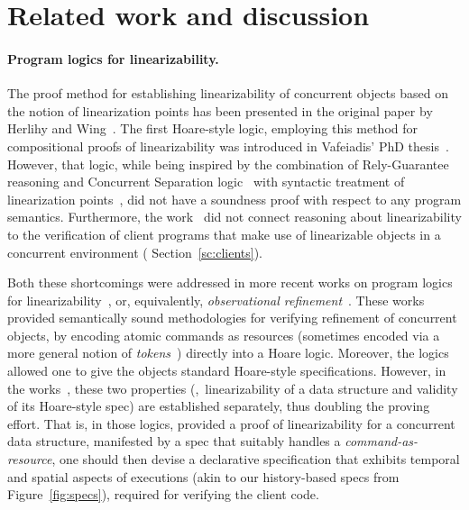 \section{Related work and discussion}
\label{sc:related}


\paragraph{Program logics for linearizability.}

The proof method for establishing linearizability of concurrent
objects based on the notion of linearization points has been
presented in the original paper by Herlihy and
Wing~\cite{HerlihyW+TOPLAS90}. The first Hoare-style logic, employing
this method for compositional proofs of linearizability was introduced
in Vafeiadis' PhD thesis~\cite{Vafeiadis+PhD07}. However, that logic,
while being inspired by the combination of Rely-Guarantee reasoning
and Concurrent Separation logic~\cite{VafeiadisP+CONCUR07} with
syntactic treatment of linearization
points~\cite{VafeiadisHHS+PPoPP06}, did not have a soundness proof
with respect to any program semantics. Furthermore, the
work~\cite{Vafeiadis+PhD07} did not connect reasoning about
linearizability to the verification of client programs that make use
of linearizable objects in a concurrent environment (\cf
Section~\ref{sc:clients}).



Both these shortcomings were addressed in more recent works on program
logics for linearizability~\cite{LiangF+PLDI13,Khyzha-al:FM16}, or,
equivalently, \emph{observational
  refinement}~\cite{FilipovicOHRW+TCS10,TuronDB+ICFP13}. These works
provided semantically sound methodologies for verifying refinement of
concurrent objects, by encoding atomic commands as resources
(sometimes encoded via a more general notion of
\emph{tokens}~\cite{Khyzha-al:FM16}) directly into a Hoare
logic. Moreover, the logics~\cite{LiangF+PLDI13, TuronDB+ICFP13}
allowed one to give the objects standard Hoare-style specifications.
%
However, in the works~\cite{LiangF+PLDI13,TuronDB+ICFP13}, these two
properties (\ie,~linearizability of a data structure and validity of
its Hoare-style spec) are established separately, thus doubling the
proving effort.
%
That is, in those logics, provided a proof of linearizability for a
concurrent data structure, manifested by a spec that suitably handles
a \emph{command-as-resource}, one should then devise a declarative
specification that exhibits temporal and spatial aspects of executions
(akin to our history-based specs from Figure~\ref{fig:specs}),
required for verifying the client code.

